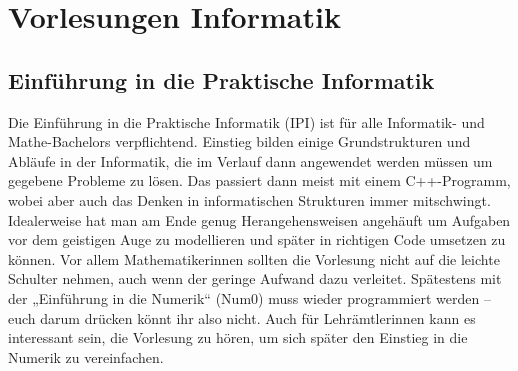 \section{Vorlesungen Informatik}

\subsection{Einführung in die Praktische Informatik}
\label{info1}
Die Einführung in die Praktische Informatik (\gls{IPI}) ist für alle Informatik- und Mathe-Bachelors verpflichtend. Einstieg bilden einige Grundstrukturen und Abläufe in der Informatik, die im Verlauf dann angewendet werden müssen um gegebene Probleme zu lösen. Das passiert dann meist mit einem C++-Programm, wobei aber auch das Denken in informatischen Strukturen immer mitschwingt. Idealerweise hat man am Ende genug Herangehensweisen angehäuft um Aufgaben vor dem geistigen Auge zu modellieren und später in richtigen Code umsetzen zu können. Vor allem Mathematikerinnen sollten die Vorlesung nicht auf die leichte Schulter nehmen, auch wenn der geringe Aufwand dazu verleitet. Spätestens mit der „Einführung in die Numerik“ (\gls{Num0}) muss wieder programmiert werden -- euch darum drücken könnt ihr also nicht. Auch für Lehrämtlerinnen kann es interessant sein, die Vorlesung zu hören, um sich später den Einstieg in die Numerik zu vereinfachen.
